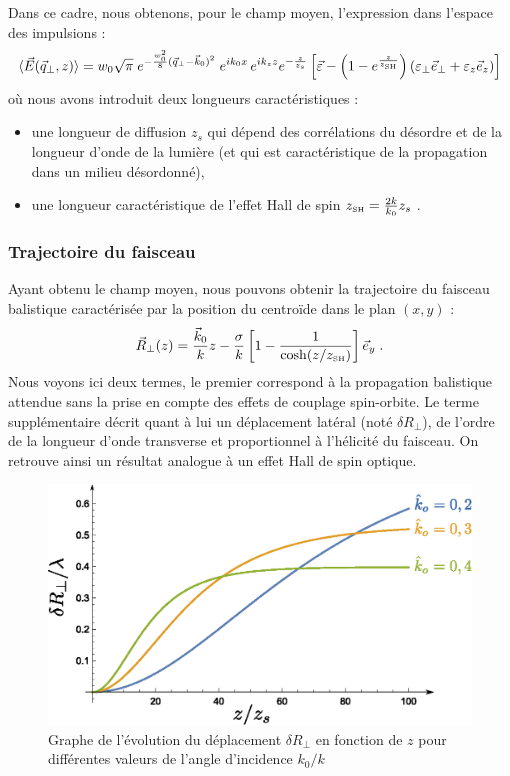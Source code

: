 \documentclass[a4paper,11pt]{article} %
\begin{document}
	Dans ce cadre, nous obtenons, pour le champ moyen, l'expression dans l'espace des impulsions :
	\begin{equation*}
		\langle \vec{E} (\vec{q}_\perp, z) \rangle = w_0\sqrt{\pi} \; e^{-\frac{w_0^2}{8} (\vec{q}_\perp - \vec{k}_0)^2 } \; e^{i k_0 x} \, e^{i k_z z} e^{- \frac{z}{z_s}} \left[ \vec{\varepsilon} - \left( 1 - e^{\frac{z}{z_{\text{\tiny SH}}}} \right) (\varepsilon_\perp \vec{e}_\perp + \varepsilon_z \vec{e}_z) \right]
	\end{equation*}
	où nous avons introduit deux longueurs caractéristiques :
	\begin{itemize}
		\item une longueur de diffusion $ z_s $ qui dépend des corrélations du désordre et de la longueur d'onde de la lumière (et qui est caractéristique de la propagation dans un milieu désordonné),
		\item une longueur caractéristique de l'effet Hall de spin $ z_\text{\tiny SH} = \frac{2k}{k_0} z_s $ .
	\end{itemize}
	
	
	\subsubsection{Trajectoire du faisceau}
	
	Ayant obtenu le champ moyen, nous pouvons obtenir la trajectoire du faisceau balistique caractérisée par la position du centroïde dans le plan $ (x,y) $ :
	\begin{equation*}
		\vec{R}_\perp (z) = \frac{\vec{k}_0}{k} z - \frac{\sigma}{k} \left[ 1 - \frac{1}{\cosh (z/z_\text{\tiny SH})} \right] \vec{e}_y \; .
	\end{equation*}
	Nous voyons ici deux termes, le premier correspond à la propagation balistique attendue sans la prise en compte des effets de couplage spin-orbite. Le terme supplémentaire décrit quant à lui un déplacement latéral (noté $ \delta R_\perp $), de l'ordre de la longueur d'onde transverse et proportionnel à l'hélicité du faisceau. On retrouve ainsi un résultat analogue à un effet Hall de spin optique.
	
	\begin{figure}[h]
		\centering
		\begin{minipage}[c]{0.85\linewidth}
			\centering
			\includegraphics[width=0.8\linewidth]{./Illustrations/Plot_delta-R}
			\caption{Graphe de l'évolution du déplacement $ \delta R_\perp $ en fonction de $ z $ pour différentes valeurs de l'angle d'incidence $ k_0/k $}
			\label{fig:Plot_delta-R}
		\end{minipage}
	\end{figure}
	
\end{document}
